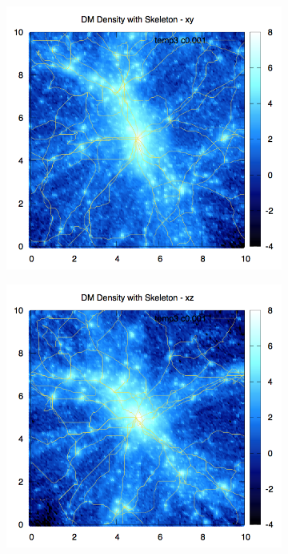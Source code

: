 \documentclass[journal]{IEEEtran}
\begin{document}

\begin{figure}[t!]
\centering
	\begin{subfigure}[t]{0.3\textwidth}
		\centering
		\includegraphics[width=\linewidth]{DMDenSkelxy.png}
	\end{subfigure}
	\quad
	\begin{subfigure}[t]{0.3\textwidth}
		\centering
		\includegraphics[width=\linewidth]{DMDenSkelxz.png}

\end{subfigure}
\end{figure}
\end{document}
